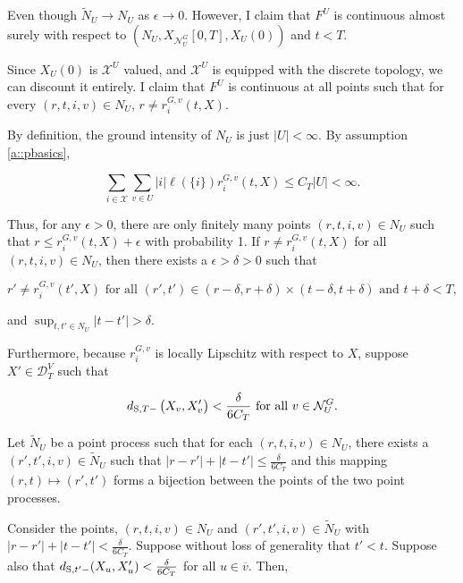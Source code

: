 \documentclass[12pt]{article}
\newcommand{\mc}{\mathcal}
\newcommand{\ra}{\rightarrow}
\newcommand{\ov}{\overline}
\newcommand{\te}{\text}
\newcommand{\ep}{\epsilon}
\newcommand{\ind}{\hspace{24pt}}
\newcommand{\cad}{\mc{D}}							%
\newcommand{\sta}{\mc{X}}							%
\newcommand{\gneigh}[2]{\mc{N}^{#1}_{#2}}			%
\newcommand{\cl}[1]{\ov{#1}}						%
\newcommand{\Xf}{X}									%
\newcommand{\poiss}{N}								%
\newcommand{\Sm}{\ell}								%
\newcommand{\rate}{r}								%
\newcommand{\stmet}[1]{
\ifstrempty{#1}{
	d_{\te{S}}}{
	d_{\te{S},#1}}}									%
\newcommand{\poissv}[1]{_{#1}}						%
\newcommand{\vind}[1]{_{#1}}						%
\newcommand{\tme}[1]{(#1)}							%
\newcommand{\tmi}[1]{#1}							%
\newcommand{\vpara}[1]{^{#1}}						%
\newcommand{\stpara}[1]{_{#1}}						%
\newcommand{\tpara}[1]{_{#1}}						%
\newcommand{\gvpara}[2]{^{#1,#2}}					%
\newcommand{\jumpbd}[1]{C_{#1}}						%
\newcommand{\tmepro}[2]{(#1,#2)}					%
\newcommand{\alt}[1]{\tilde{#1}}					%
\begin{document}
Even though \(\alt{\poiss}\poissv{U} \ra \poiss\poissv{U}\) as \(\ep \ra 0\). However, I claim that \(F\vpara{U}\) is continuous almost surely with respect to \(\left(\poiss\poissv{U},\Xf\vind{\gneigh{G}{U}}\tmi{[0,T]},\Xf\vind{U}\tme{0}\right)\) and \(t < T\).

\ind Since \(\Xf\vind{U}\tme{0}\) is \(\sta^U\) valued, and \(\sta^U\) is equipped with the discrete topology, we can discount it entirely. I claim that \(F\vpara{U}\) is continuous at all points such that for every \((r,t,i,v) \in \poiss\poissv{U}\), \(r \neq \rate\gvpara{G}{v}\stpara{i}\tmepro{t}{\Xf}\).

\ind By definition, the ground intensity of \(\poiss\poissv{U}\) is just \(|U| < \infty\). By assumption \ref{a::pbasics}, 

\[\sum_{i\in \sta}\sum_{v \in U} |i|\Sm(\{i\})\rate\gvpara{G}{v}\stpara{i}\tmepro{t}{\Xf} \leq \jumpbd{T}|U| < \infty.\]

Thus, for any \(\ep > 0\), there are only finitely many points \((r,t,i,v) \in \poiss\poissv{U}\) such that \(r \leq \rate\gvpara{G}{v}\stpara{i}\tmepro{t}{\Xf} + \ep\) with probability 1. If \(r \neq \rate\gvpara{G}{v}\stpara{i}\tmepro{t}{\Xf}\) for all \((r,t,i,v) \in \poiss\poissv{U}\), then there exists a \(\ep > \delta > 0\) such that 

\[r' \neq \rate\gvpara{G}{v}\stpara{i}\tmepro{t'}{\Xf} \te{ for all } (r',t') \in (r-\delta,r+\delta)\times (t-\delta,t+\delta) \te{ and } t + \delta < T,\]

and \(\sup_{t,t'\in \poiss\poissv{U}} |t - t'| > \delta.\)

\ind Furthermore, because \(\rate\gvpara{G}{v}\stpara{i}\) is locally Lipschitz with respect to \(\Xf\), suppose \(\Xf' \in \cad\vpara{V}\tpara{T}\) such that 

\[\stmet{T-}\left(\Xf\vind{v},\Xf'\vind{v}\right) < \frac{\delta}{6\jumpbd{T}} \te{ for all } v \in \gneigh{G}{U}.\]

Let \(\alt{\poiss}\poissv{U}\) be a point process such that for each \((r,t,i,v) \in \poiss\poissv{U}\), there exists a \((r',t',i,v) \in \alt{\poiss}\poissv{U}\) such that \(|r - r'| + |t - t'| \leq \frac{\delta}{6\jumpbd{T}}\) and this mapping \((r,t) \mapsto (r',t')\) forms a bijection between the points of the two point processes. 

\ind Consider the points, \((r,t,i,v) \in \poiss\poissv{U}\) and \((r',t',i,v) \in \alt{\poiss}\poissv{U}\) with \(|r - r'| + |t - t'| < \frac{\delta}{6\jumpbd{T}}\). Suppose without loss of generality that \(t' < t\). Suppose also that \(\stmet{t'-}(\Xf\vind{u},\Xf'\vind{u}) < \frac{\delta}{6\jumpbd{T}}\) for all \(u \in \cl{v}\). Then, 
\end{document}
